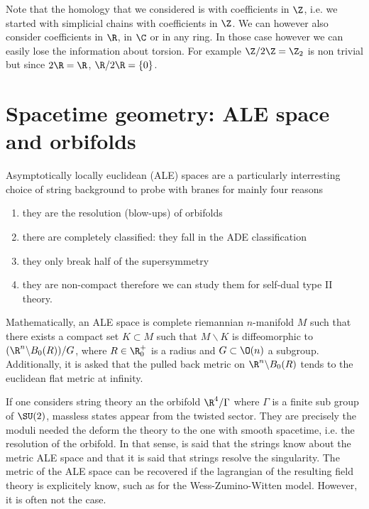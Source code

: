     Note that the homology that we considered is with coefficients in $\Z$, i.e. we started with simplicial chains with coefficients in $\Z$. We can however also consider coefficients in $\R$, in $\C$ or in any ring. In those case however we can easily lose the information about torsion. For example $\Z/2\Z=\Z_2$ is non trivial but since $2\R=\R$, $\R/2\R=\{0\}$.

\section{Spacetime geometry: ALE space and orbifolds}\label{app:spacetimegeom}

    Asymptotically locally euclidean (ALE) spaces are a particularly interresting choice of string background to probe with branes for mainly four reasons
    \begin{enumerate}[label=(\roman*)]
        \item they are the resolution (blow-ups) of orbifolds
        \item there are completely classified: they fall in the ADE classification
        \item they only break half of the supersymmetry
        \item they are non-compact therefore we can study them for self-dual type II theory. 
    \end{enumerate}
    Mathematically, an ALE space is complete riemannian $n$-manifold $M$ such that there exists a compact set $K\subset M$ such that $M\backslash K$ is diffeomorphic to $(\R^n\backslash B_0(R))/G$, where $R\in\R^+_0$ is a radius and $G\subset\O(n)$ a subgroup. Additionally, it is asked that the pulled back metric on $\R^n\backslash B_0(R)$ tends to the euclidean flat metric at infinity.

    If one considers string theory an the orbifold $\R^4/\Gamma$ where $\Gamma$ is a finite sub group of $\SU(2)$, massless states appear from the twisted sector. They are precisely the moduli needed the deform the theory to the one with smooth spacetime, i.e. the resolution of the orbifold. In that sense, is said that the strings know about the metric ALE space and that it is said that strings resolve the singularity. The metric of the ALE space can be recovered if the lagrangian of the resulting field theory is explicitely know, such as for the Wess-Zumino-Witten model. However, it is often not the case.



        

